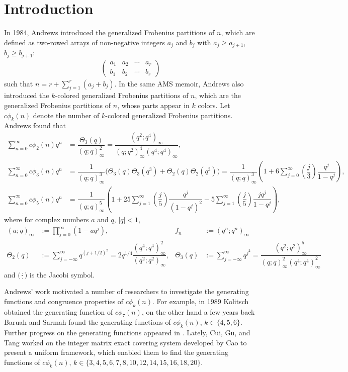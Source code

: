 \documentclass[12pt]{article}
\numberwithin{equation}{section}
\theoremstyle{plain}
\numberwithin{theorem}{section}
\theoremstyle{definition}
\theoremstyle{remark}
\begin{document}
	\section{Introduction}
    In 1984, Andrews \cite{And84} introduced the generalized Frobenius partitions of $n$, which are defined as two-rowed arrays of non-negative integers $a_j$ and $b_j$ with $a_j\ge a_{j+1}$, $b_j\ge b_{j+1}$:
    \begin{align*}
        \begin{pmatrix}
            a_1 & a_2 & \cdots & a_r\\
            b_1 & b_2 & \cdots & b_r
        \end{pmatrix}
    \end{align*}
    such that $\displaystyle{n=r+\sum_{j=1}^r}(a_j+b_j)$. In the same AMS memoir, Andrews also introduced the $k$-colored generalized Frobenius partitions of $n$, which are the generalized Frobenius partitions of $n$, whose parts appear in $k$ colors. Let $c\phi_k(n)$ denote the number of $k$-colored generalized Frobenius partitions. Andrews found that
    \begin{align*}
        \sum_{n=0}^\infty c\phi_2(n)q^n&=\dfrac{\Theta _3(q)}{(q;q)_\infty ^2} =\dfrac{(q^2;q^4)_\infty }{(q;q^2)_\infty ^4(q^4;q^4)_\infty },\\
        \sum_{n=0}^\infty c\phi_3(n)q^n&=\dfrac{1}{(q;q)_\infty ^3} \big (\Theta _3(q)\Theta _3(q^3)+\Theta _2(q)\Theta _2(q^3)\big )= \dfrac{1}{(q;q)_\infty ^3}{\left( 1+6\sum _{j=0}^\infty {\left( \dfrac{j}{3}\right) } \dfrac{q^j}{1-q^j}\right) },\\
        \sum_{n=0}^\infty c\phi_5(n)q^n&=\dfrac{1}{(q;q)_\infty ^5}{\left( 1+25\sum _{j=1}^\infty {\left( \dfrac{j}{5}\right) \dfrac{q^j}{(1-q^j)^2}} -5\sum _{j=1}^\infty {\left( \dfrac{j}{5}\right) \dfrac{jq^j}{1-q^j}}\right) },
    \end{align*}
    where for complex numbers $a$ and $q$, $\mid q\mid<1$,
    \begin{align*}
        (a;q)_\infty&:= \prod_{j=0}^\infty(1-aq^j),& f_n&:=(q^n;q^n)_\infty\\ 
        \Theta _2(q)&:=\sum _{j=-\infty }^\infty q^{(j+1/2)^2} =2q^{1/4}\dfrac{(q^4;q^4)_\infty ^2}{(q^2;q^2)_\infty }, & \Theta _3(q)&:=\sum _{j=-\infty }^\infty q^{j^2} =\dfrac{(q^2;q^2)_\infty ^5}{(q;q)_\infty ^2(q^4;q^4)_\infty ^2}
    \end{align*}
     and $\big (\frac{\cdot }{\cdot}\big )$ is the Jacobi symbol.

     Andrews' work motivated a number of researchers to investigate the generating functions and congruence properties of $c\phi_{k}(n)$. For example, in 1989 Kolitsch \cite{Kol89} obtained the generating function of $c\phi_{7}(n)$, on the other hand a few years back Baruah and Sarmah \cite{BS11,BS15} found the generating functions of $c\phi_{k}(n)$, $k\in\{4,5,6\}$. Further progress on the generating functions appeared in \cite{CWW19, JRW22, CGT24,  CGT24b, CSX25}. Lately, Cui, Gu, and Tang \cite{CGT25} worked on the integer matrix exact covering system developed by Cao \cite{Cao11} to present a uniform framework, which enabled them to find the generating functions of $c\phi_k(n)$, $k\in\{3,4,5,6,7,8,10,12,14,15,16,18,20\}$.
\end{document}
